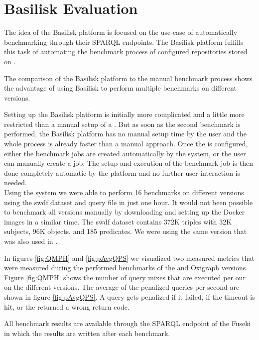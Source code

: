 \section{Basilisk Evaluation}
The idea of the Basilisk platform is focused on the use-case of automatically benchmarking \tsp{} through their SPARQL endpoints.
The Basilisk platform fulfills this task of automating the benchmark process of configured \ts{} repositories stored on \dockh{}.

The comparison of the Basilisk platform to the manual benchmark process shows the advantage of using Basilisk to perform multiple benchmarks on different \ts{} versions.

Setting up the Basilisk platform is initially more complicated and a little more restricted than a manual setup of a \ts{}.
But as soon as the second benchmark is performed, the Basilisk platform has no manual setup time by the user and the whole process is already faster than a manual approach.
Once the \ts{} is configured, either the benchmark jobs are created automatically by the system, or the user can manually create a job.
The setup and execution of the benchmark job is then done completely automatic by the platform and no further user interaction is needed.
\\

Using the system we were able to perform 16 benchmarks on different \tentris{} versions using the \ac{swdf} dataset and query file in just one hour.
It would not been possible to benchmark all versions manually by downloading and setting up the Docker images in a similar time.
The \ac{swdf} dataset contains 372K triples with 32K subjects, 96K objects, and 185 predicates.
We were using the same version that was also used in \cite{bigerlTentrisTensorBasedTriple2020}.

In figures \ref{fig:QMPH} and \ref{fig:pAvgQPS} we visualized two measured metrics that were measured during the performed benchmarks of the \tentris{} and Oxigraph versions.
Figure \ref{fig:QMPH} shows the number of query mixes that are executed per our on the different \ts{} versions.
The average of the penalized queries per second are shown in figure \ref{fig:pAvgQPS}.
A query gets penalized if it failed, \eg{} if the timeout is hit, or the \ts{} returned a wrong return code.

All benchmark results are available through the SPARQL endpoint of the Fuseki \ts{} in which the results are written after each benchmark.


